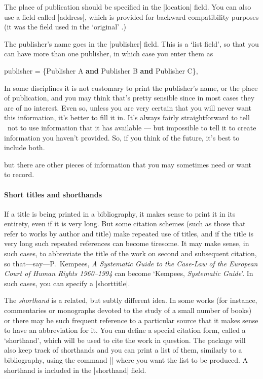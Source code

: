 The place of publication should be specified in the |location|
field. You can also use a field called |address|, which is provided
for backward compatibility purposes (it was the field used in the
`original' \bibtex.)

The publisher's name goes in the |publisher| field. This is a `list
field', so that you can have more than one publisher, in which case
you enter them as
\begin{center}
\ttfamily
publisher = \{Publisher A \textbf{and} Publisher B \textbf{and} Publisher C\},
\end{center}

In some disciplines it is not customary to print the publisher's name,
or the place of publication, and you may think that's pretty
sensible since in most cases they are of no interest. Even so, unless
you are very certain that you will never want this information, it's
better to fill it in. It's always fairly straightforward to tell
\biblatex\ not to use information that it has available --- but
impossible to tell it to create information you haven't provided. So,
if you think of the future, it's best to include both.

 but there are other pieces of information
that you may sometimes need or want to record.

\paragraph{Short titles and shorthands} If a title is being printed in
a bibliography, it makes sense to print it in its entirety, even if it
is very long. But some citation schemes (such as those that refer to
works by author and title) make repeated use of titles, and if the
title is very long such repeated references can become tiresome. It
may make sense, in such cases, to abbreviate the title of the work on
second and subsequent citation, so that---say---P.\ Kempees, \emph{A
  Systematic Guide to the Case-Law of the European Court of Human
  Rights 1960--1994} can become `Kempees, \emph{Systematic Guide}'. In
such cases, you can specify a |shorttitle|.

\label{shorthands}
The \emph{shorthand} is a related, but subtly different idea. In some
works (for instance, commentaries or monographs devoted to the study
of a small number of books) or there may be such frequent
reference to a particular source that it makes sense to have an
abbreviation for it. You can define a special citation form, called a
`shorthand', which will be used to cite the work in question. The
package will also keep track of shorthands and you can print a list of
them, similarly to a bibliography, using the command
|\printshorthands| where you want the list to be produced. A shorthand is included in the
|shorthand| field.


